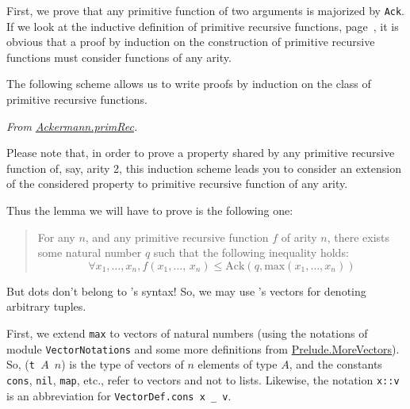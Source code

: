 First, we prove that any primitive function of two arguments is majorized by \texttt{Ack}.
If we look at the inductive definition of primitive recursive functions, page~\pageref{def:Primrec}, it is obvious that a proof by induction on the construction of primitive recursive functions must consider functions of any arity.

The following scheme allows us to write proofs by induction on the class of primitive recursive functions. 

\vspace{4pt}
\noindent
\emph{From \href{../theories/html/hydras.Ackermann.primRec.html}{Ackermann.primRec}.}


 



Please note that, in order to prove a property shared by any primitive recursive function of, say, arity 2, this induction scheme  leads you to consider an extension of the considered property to primitive recursive function of any arity.

Thus the lemma we will have to prove is the following one:


  \begin{quote}
    For any $n$, and any primitive recursive function $f$ of  arity $n$, there exists some natural number $q$ such that the following inequality holds:
 \[
  \forall x_1,\dots,x_n, 
      f(x_1,\dots,\,x_n)\leq\textrm{Ack}(q,\textrm{max}(x_1,\dots,x_n))
\]
 \end{quote}


But dots don't belong to \gallina's syntax! So, we may use \coq's vectors for denoting arbitrary tuples.

First, we extend \texttt{max} to vectors of natural numbers (using the notations of module \texttt{VectorNotations} and some more definitions from 
\href{../theories/html/hydras.Prelude.MoreVectors.html}{Prelude.MoreVectors}). So, (\texttt{t\,$A$\,$n$}) is the type of vectors of $n$ elements of type $A$, and the constants \texttt{cons}, \texttt{nil}, \texttt{map}, etc., refer to vectors and not to lists. Likewise, the notation \texttt{x::v} is an abbreviation for
\texttt{VectorDef.cons x \_ v}.







